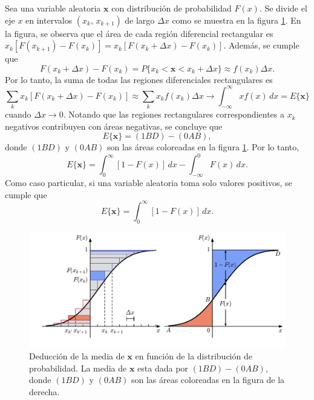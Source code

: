 \documentclass[a4paper]{report}
\newcommand{\x}{\mathbf{x}}
\begin{document}
Sea una variable aleatoria \(\x\) con distribución de probabilidad \(F(x)\). Se divide el eje \(x\) en intervalos \((x_k,\,x_{k+1})\) de largo \(\Delta x\) como se muestra en la figura \ref{fig:mean_and_distribution}. En la figura, se observa que el área de cada región diferencial rectangular es \(x_k[F(x_{k+1})-F(x_k)]=x_k[F(x_k+\Delta x)-F(x_k)]\). Además, se cumple que
\[
 F(x_k+\Delta x)-F(x_k)=P\{x_k<\x<x_k+\Delta x\}\approx f(x_k)\Delta x.
\]
Por lo tanto, la suma de todas las regiones diferenciales rectangulares es
\[
 \sum_k x_k[F(x_k+\Delta x)-F(x_k)]\approx \sum_k x_kf(x_k)\Delta x \to \int_{-\infty}^{\infty} xf(x)\,dx=E\{\x\}
\]
cuando \(\Delta x \to 0\). Notando que las regiones rectangulares correspondientes a \(x_k\) negativos contribuyen con áreas negativas, se concluye que
\[
 E\{\x\}=(1BD)-(0AB),
\]
donde \((1BD)\) y \((0AB)\) son las áreas coloreadas en la figura \ref{fig:mean_and_distribution}. Por lo tanto,
\[
 E\{\x\}=\int_{0}^{\infty}[1-F(x)]\,dx-\int_{-\infty}^{0}F(x)\,dx.
\]
Como caso particular, si una variable aleatoria toma solo valores positivos, se cumple que
\[
 E\{\x\}=\int_{0}^{\infty}[1-F(x)]\,dx.
\]
\begin{figure}[!htb]
\begin{center}
\includegraphics[width=1\columnwidth]{figuras/mean_and_distribution.pdf}
\caption{\label{fig:mean_and_distribution} Deducción de la media de \(\x\) en función de la distribución de probabilidad. La media de \(\x\) esta dada por \((1BD)-(0AB)\), donde \((1BD)\) y \((0AB)\) son las áreas coloreadas en la figura de la derecha.}
\end{center}
\end{figure}
\end{document}
